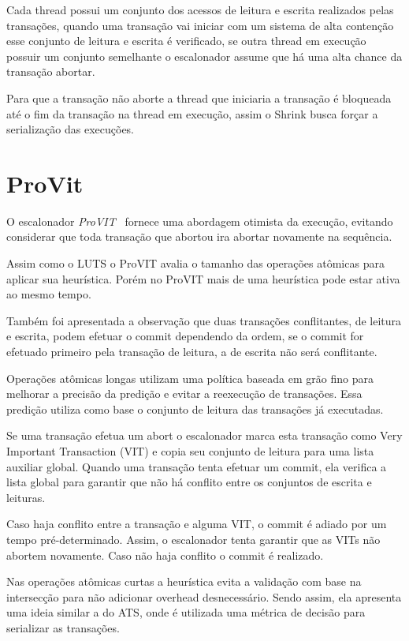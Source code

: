 \documentclass[diss,capa]{texufpel}
\begin{document}
Cada thread possui um conjunto dos acessos de leitura e escrita realizados pelas transações, quando uma transação vai iniciar com um sistema de alta contenção esse conjunto de leitura e escrita é verificado, se outra thread em execução possuir um conjunto semelhante o escalonador assume que há uma alta chance da transação abortar.

Para que a transação não aborte a thread que iniciaria a transação é bloqueada até o fim da transação na thread em execução, assim o Shrink busca forçar a serialização das execuções.

\section{ProVit}

O escalonador \emph{ProVIT}~\cite{rito2015} fornece uma abordagem otimista da execução, evitando considerar que toda transação que abortou ira abortar novamente na sequência.

Assim como o LUTS o ProVIT avalia o tamanho das operações atômicas para aplicar sua heurística. Porém no ProVIT mais de uma heurística pode estar ativa ao mesmo tempo.

Também foi apresentada a observação que duas transações conflitantes, de leitura e escrita, podem efetuar o commit dependendo da ordem, se o commit for efetuado primeiro pela transação de leitura, a de escrita não será conflitante.

Operações atômicas longas utilizam uma política baseada em grão fino para melhorar a precisão da predição e evitar a reexecução de transações. Essa predição utiliza como base o conjunto de leitura das transações já executadas.

Se uma transação efetua um abort o escalonador marca esta transação como Very Important Transaction (VIT) e copia seu conjunto de leitura para uma lista auxiliar global.  Quando uma transação tenta efetuar um commit, ela verifica a lista global para garantir que não há conflito entre os conjuntos de escrita e leituras.

Caso haja conflito entre a transação e alguma VIT, o commit é adiado por um tempo pré-determinado. Assim, o escalonador tenta garantir que as VITs não abortem novamente. Caso não haja conflito o commit é realizado.

Nas operações atômicas curtas a heurística evita a validação com base na intersecção para não adicionar overhead desnecessário. Sendo assim, ela apresenta uma ideia similar a do ATS, onde é utilizada uma métrica de decisão para serializar as transações.
\end{document}
